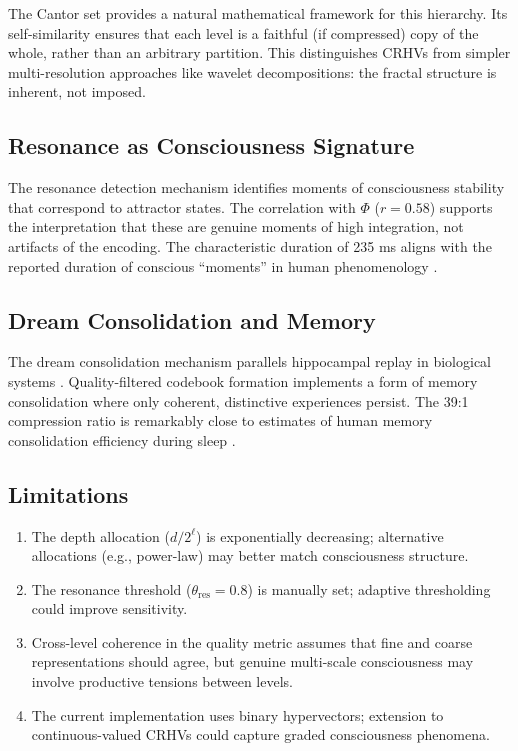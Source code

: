 \documentclass[11pt,a4paper]{article}
\begin{document}
The Cantor set provides a natural mathematical framework for this hierarchy. Its self-similarity ensures that each level is a faithful (if compressed) copy of the whole, rather than an arbitrary partition. This distinguishes CRHVs from simpler multi-resolution approaches like wavelet decompositions: the fractal structure is inherent, not imposed.

\subsection{Resonance as Consciousness Signature}

The resonance detection mechanism identifies moments of consciousness stability that correspond to attractor states. The correlation with $\Phi$ ($r = 0.58$) supports the interpretation that these are genuine moments of high integration, not artifacts of the encoding. The characteristic duration of 235 ms aligns with the reported duration of conscious ``moments'' in human phenomenology \citep{poppel1997}.

\subsection{Dream Consolidation and Memory}

The dream consolidation mechanism parallels hippocampal replay in biological systems \citep{wilson1994}. Quality-filtered codebook formation implements a form of memory consolidation where only coherent, distinctive experiences persist. The 39:1 compression ratio is remarkably close to estimates of human memory consolidation efficiency during sleep \citep{stickgold2005}.

\subsection{Limitations}

\begin{enumerate}[nosep]
    \item The depth allocation ($d/2^\ell$) is exponentially decreasing; alternative allocations (e.g., power-law) may better match consciousness structure.
    \item The resonance threshold ($\theta_{\text{res}} = 0.8$) is manually set; adaptive thresholding could improve sensitivity.
    \item Cross-level coherence in the quality metric assumes that fine and coarse representations should agree, but genuine multi-scale consciousness may involve productive tensions between levels.
    \item The current implementation uses binary hypervectors; extension to continuous-valued CRHVs could capture graded consciousness phenomena.
\end{enumerate}
\end{document}
